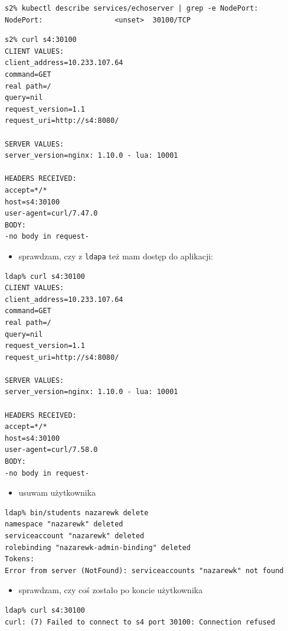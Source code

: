\documentclass[a4paper,12pt,twoside,openany]{report}
\providecommand{\tightlist}{%
  \setlength{\itemsep}{0pt}\setlength{\parskip}{0pt}}
\newcommand{\passthrough}[1]{#1}
\begin{document}
\begin{lstlisting}
s2% kubectl describe services/echoserver | grep -e NodePort:
NodePort:                 <unset>  30100/TCP
\end{lstlisting}

\begin{lstlisting}
s2% curl s4:30100
CLIENT VALUES:
client_address=10.233.107.64
command=GET
real path=/
query=nil
request_version=1.1
request_uri=http://s4:8080/

SERVER VALUES:
server_version=nginx: 1.10.0 - lua: 10001

HEADERS RECEIVED:
accept=*/*
host=s4:30100
user-agent=curl/7.47.0
BODY:
-no body in request-
\end{lstlisting}

\begin{itemize}
\tightlist
\item
  sprawdzam, czy z \passthrough{\lstinline!ldapa!} też mam dostęp do
  aplikacji:
\end{itemize}

\begin{lstlisting}
ldap% curl s4:30100
CLIENT VALUES:
client_address=10.233.107.64
command=GET
real path=/
query=nil
request_version=1.1
request_uri=http://s4:8080/

SERVER VALUES:
server_version=nginx: 1.10.0 - lua: 10001

HEADERS RECEIVED:
accept=*/*
host=s4:30100
user-agent=curl/7.58.0
BODY:
-no body in request-
\end{lstlisting}

\begin{itemize}
\tightlist
\item
  usuwam użytkownika
\end{itemize}

\begin{lstlisting}
ldap% bin/students nazarewk delete
namespace "nazarewk" deleted
serviceaccount "nazarewk" deleted
rolebinding "nazarewk-admin-binding" deleted
Tokens:
Error from server (NotFound): serviceaccounts "nazarewk" not found
\end{lstlisting}

\begin{itemize}
\tightlist
\item
  sprawdzam, czy coś zostało po koncie użytkownika
\end{itemize}

\begin{lstlisting}
ldap% curl s4:30100
curl: (7) Failed to connect to s4 port 30100: Connection refused
\end{lstlisting}
\end{document}

